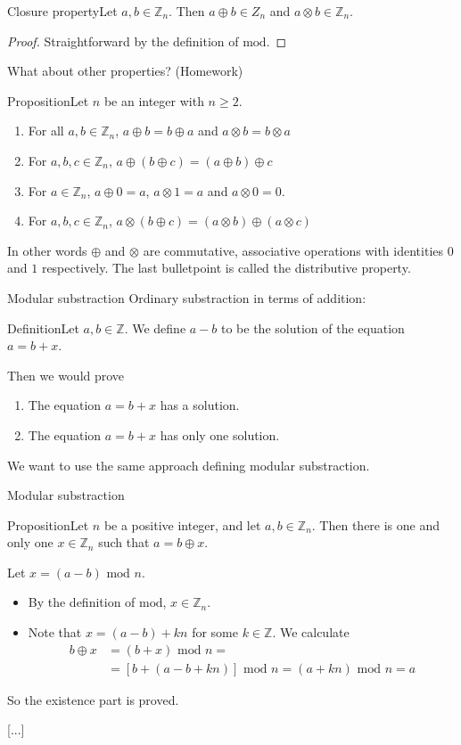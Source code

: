 \documentclass{beamer}
\def\bl[#1]#2{\begin{block}{#1}#2\end{block}}
\def\enumb{\begin{enumerate}}
\def\enume{\end{enumerate}}
\def\itemb{\begin{itemize}}
\def\iteme{\end{itemize}}
\begin{document}
\begin{frame}
\bl[Closure property]{Let $a,b\in\mathbb{Z}_{n}$. Then $a\oplus b\in Z_n$ and $a\otimes b\in \mathbb{Z}_n$.}
\begin{proof}
Straightforward by the definition of $\textrm{mod}$.
\end{proof}
What about other properties? (Homework)
\bl[Proposition]{Let $n$ be an integer with $n\geq 2$.
\enumb
\item For all $a,b\in\mathbb{Z}_n$, $a\oplus b=b\oplus a$ and $a\otimes b=b\otimes a$
\item For $a,b,c\in\mathbb{Z}_n$, $a\oplus (b\oplus c)=(a\oplus b)\oplus c$
\item For $a\in\mathbb{Z}_n$, $a\oplus 0=a$, $a\otimes 1=a$ and $a\otimes 0=0$.
\item For $a,b,c\in\mathbb{Z}_n$, $a\otimes (b\oplus c)= (a\otimes b)\oplus (a\otimes c)$
\enume}
In other words $\oplus$ and $\otimes$ are commutative, associative operations with identities $0$ and $1$ respectively. The last bulletpoint is called the distributive property. 
\end{frame}

\begin{frame}{Modular substraction}
Ordinary substraction in terms of addition:
\bl[Definition]{Let $a,b\in\mathbb{Z}$. We define $a-b$ to be the solution of the equation $a=b+x$.}
Then we would prove
\enumb
\item The equation $a=b+x$ has a solution.
\item The equation $a=b+x$ has only one solution.
\enume

\center \color{red}We want to use the same approach defining modular substraction.\color{red}
\end{frame}

\begin{frame}{Modular substraction}
\bl[Proposition]{Let $n$ be a positive integer, and let $a,b\in\mathbb{Z}_n$. Then there is one and only one $x\in\mathbb{Z}_n$ such that $a=b\oplus x$.}


Let $x=(a-b)\textrm{ mod }n$.
\itemb
\item By the definition of $\textrm{mod}$, $x\in\mathbb{Z}_n$.
\item Note that $x=(a-b)+kn$ for some $k\in\mathbb{Z}$. We calculate
\begin{align*}
b\oplus x&=(b+x)\textrm{ mod } n=\\
&=[b+(a-b+kn)]\textrm{ mod }n=(a+kn)\textrm{ mod }n=a
\end{align*}
\iteme
So the existence part is proved.

[...]
\end{frame}
\end{document}
